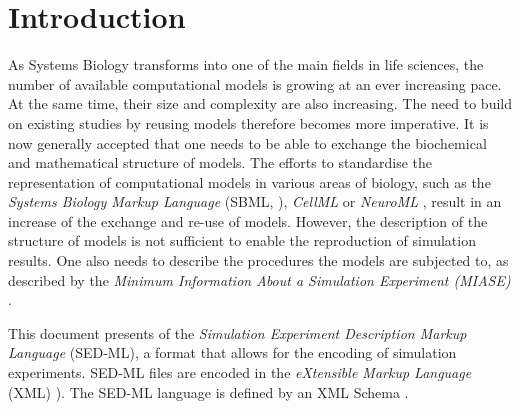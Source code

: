 \section{Introduction}

As Systems Biology transforms into one of the main fields in life sciences, the number of available computational models is growing at an ever increasing pace. At the same time, their size and complexity are also increasing. The need to build on existing studies by reusing models therefore becomes more imperative. It is now generally accepted that one needs to be able to exchange the biochemical and mathematical structure of models. The efforts to standardise the representation of computational models in various areas of biology, such as the \emph{Systems Biology Markup Language} (SBML, \citet{Hucka:2003}), \emph{CellML} \citet{Lloyd:2004} or \emph{NeuroML} \citet{Goddard:2001}, result in an increase of the exchange and re-use of models. However, the description of the structure of models is not sufficient to enable the reproduction of simulation results. 
One also needs to describe the procedures the models are subjected to, as described by the 
\emph{Minimum Information About a Simulation Experiment (MIASE)} \citep{Waltemath:2010}. 

This document presents  \LoneVone of the \emph{Simulation Experiment Description Markup Language} (SED-ML), a format that allows for the encoding of simulation experiments. SED-ML files are encoded in the \emph{eXtensible Markup Language} (XML) \citep{Bray:2006}). The SED-ML language is defined by an XML Schema \citep{Fallside:2001}. 

